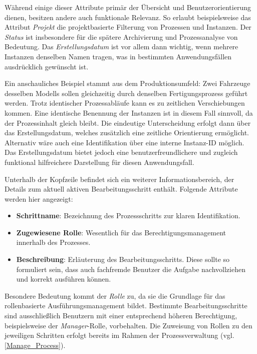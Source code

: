 Während einige dieser Attribute primär der Übersicht und Benutzerorientierung dienen, besitzen andere auch funktionale Relevanz. So erlaubt beispielsweise das Attribut \textit{Projekt} die projektbasierte Filterung von Prozessen und Instanzen. Der \textit{Status} ist insbesondere für die spätere Archivierung und Prozessanalyse von Bedeutung. Das \textit{Erstellungsdatum} ist vor allem dann wichtig, wenn mehrere Instanzen denselben Namen tragen, was in bestimmten Anwendungsfällen ausdrücklich gewünscht ist. 

Ein anschauliches Beispiel stammt aus dem Produktionsumfeld: Zwei Fahrzeuge desselben Modells sollen gleichzeitig durch denselben Fertigungsprozess geführt werden. Trotz identischer Prozessabläufe kann es zu zeitlichen Verschiebungen kommen. Eine identische Benennung der Instanzen ist in diesem Fall sinnvoll, da der Prozessinhalt gleich bleibt. Die eindeutige Unterscheidung erfolgt dann über das Erstellungsdatum, welches zusätzlich eine zeitliche Orientierung ermöglicht. Alternativ wäre auch eine Identifikation über eine interne Instanz-ID möglich. Das Erstellungsdatum bietet jedoch eine benutzerfreundlichere und zugleich funktional hilfreichere Darstellung für diesen Anwendungsfall.

Unterhalb der Kopfzeile befindet sich ein weiterer Informationsbereich, der Details zum aktuell aktiven Bearbeitungsschritt enthält. Folgende Attribute werden hier angezeigt:

\begin{itemize}
    \item \textbf{Schrittname}: Bezeichnung des Prozessschritts zur klaren Identifikation.
    \item \textbf{Zugewiesene Rolle}: Wesentlich für das Berechtigungsmanagement innerhalb des Prozesses.
    \item \textbf{Beschreibung}: Erläuterung des Bearbeitungsschritts. Diese sollte so formuliert sein, dass auch fachfremde Benutzer die Aufgabe nachvollziehen und korrekt ausführen können.
\end{itemize}

Besondere Bedeutung kommt der \textit{Rolle} zu, da sie die Grundlage für das rollenbasierte Ausführungsmanagement bildet. Bestimmte Bearbeitungsschritte sind ausschließlich Benutzern mit einer entsprechend höheren Berechtigung, beispielsweise der \textit{Manager}-Rolle, vorbehalten. Die Zuweisung von Rollen zu den jeweiligen Schritten erfolgt bereits im Rahmen der Prozessverwaltung (vgl. \autoref{Manage_Process}).

